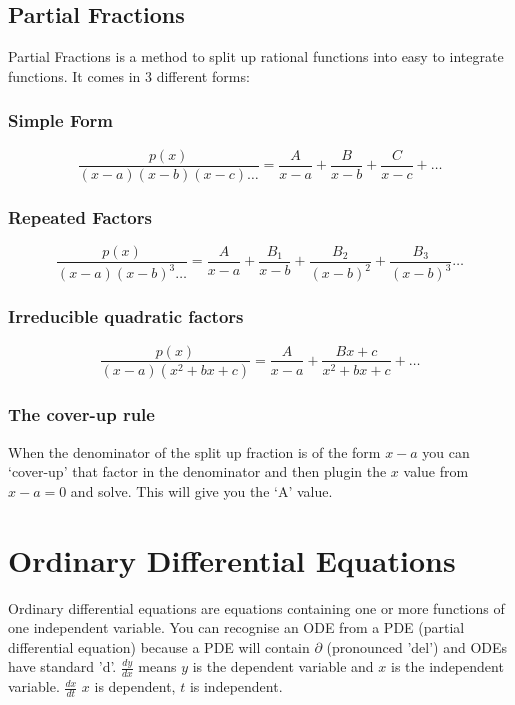 \documentclass[12pt] {article}
\begin{document}
\subsection*{Partial Fractions}
Partial Fractions is a method to split up rational functions into easy to integrate functions. 
It comes in 3 different forms:
\subsubsection*{Simple Form}
\begin{equation*}
\frac{p(x)}{(x-a)(x-b)(x-c)\dotsc} = \frac{A}{x-a} + \frac{B}{x-b} + \frac{C}{x-c} + \dotsc
\end{equation*}
\subsubsection*{Repeated Factors}
\begin{equation*}
  \frac{p(x)}{(x-a)(x-b)^3\dotsc} = \frac{A}{x-a} + \frac{B_1}{x-b} + \frac{B_2}{(x-b)^2} + \frac{B_3}{(x-b)^3} \dotsc
\end{equation*}
\subsubsection*{Irreducible quadratic factors}
\begin{equation*}
  \frac{p(x)}{(x-a)(x^2+bx+c)} = \frac{A}{x-a} + \frac{Bx+c}{x^2+bx+c} + \dotsc
\end{equation*}
\subsubsection*{The cover-up rule}
When the denominator of the split up fraction is of the form $x-a$ you can `cover-up' that factor in the denominator
and then plugin the $x$ value from $x-a=0$ and solve. This will give you the `A' value.

\section{Ordinary Differential Equations}
Ordinary differential equations are equations containing one or more functions of one independent variable. 
You can recognise an ODE from a PDE (partial differential equation) because a PDE will contain $\partial$ (pronounced 'del')
and ODEs have standard 'd'. $\frac{dy}{dx}$ means $y$ is the dependent variable and $x$ is the independent variable. $\frac{dx}{dt}$ $x$ is dependent, $t$ is independent.
\end{document}
